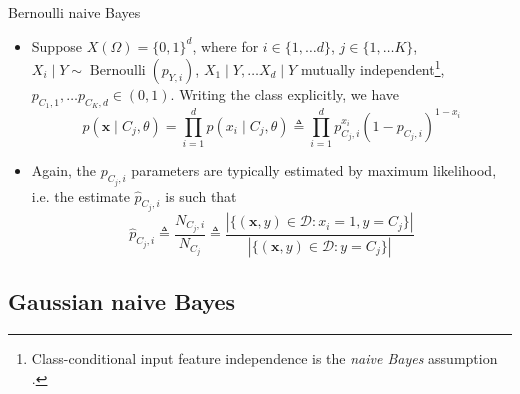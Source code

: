 \documentclass{beamer}
\numberwithin{equation}{section}
\begin{document}
\begin{frame}{Bernoulli naive Bayes}
    \begin{itemize}
        \item
        Suppose $ X(\Omega) = \{0, 1\}^d $, where for $ i \in
        \{1, \ldots d\} $, $ j \in \{1, \ldots K\} $,
        $ X_i \mid Y \sim \operatorname{Bernoulli}(p_{Y, i}) $,
         $ X_1 \mid Y, \ldots X_d \mid Y $ mutually independent\footnote{
            Class-conditional input feature independence is the
            \textit{naive Bayes} assumption \cite{bishop_ml}.
        }, $ p_{C_1, 1}, \ldots p_{C_K, d} \in (0, 1) $. Writing the class
        explicitly, we have
        \begin{equation} \label{bern_nb_like}
            p(\mathbf{x} \mid C_j, \theta) =
            \prod_{i = 1}^dp(x_i \mid C_j, \theta) \triangleq
            \prod_{i = 1}^dp_{C_j, i}^{x_i}(1 - p_{C_j, i})^{1 - x_i}
        \end{equation}

        \item
        Again, the $ p_{C_j, i} $ parameters are typically estimated by
        maximum likelihood, i.e. the estimate $ \hat{p}_{C_j, i} $ is such that
        \begin{equation} \label{bern_nb_param_mle}
            \hat{p}_{C_j, i} \triangleq \frac{N_{C_j, i}}{N_{C_j}} \triangleq
            \frac{
                |\{(\mathbf{x}, y) \in \mathcal{D} : x_i = 1, y = C_j\}|
            }{
                |\{(\mathbf{x}, y) \in \mathcal{D} : y = C_j\}|
            } 
        \end{equation}
    \end{itemize}
\end{frame}

\subsection{Gaussian naive Bayes}
\end{document}
